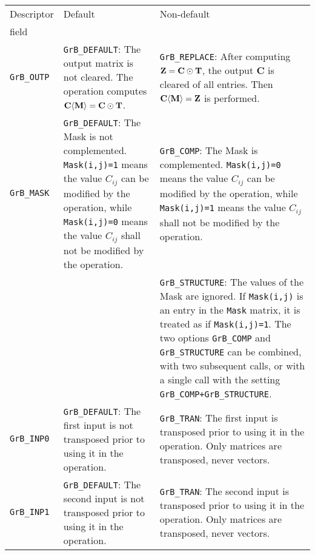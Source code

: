 \vspace{0.2in}
\noindent
{\footnotesize
\begin{tabular}{|l|p{2.4in}|p{2.2in}|}
\hline
Descriptor & Default   & Non-default \\
field      & &  \\
\hline

\verb'GrB_OUTP'
    & \verb'GrB_DEFAULT':
    The output matrix is not cleared.  The operation computes
    ${\bf C \langle M \rangle = C \odot T}$.
    & \verb'GrB_REPLACE':
    After computing ${\bf Z=C\odot T}$,
    the output {\bf C} is cleared of all entries.
    Then ${\bf C \langle M \rangle = Z}$ is performed. \\

\hline

\verb'GrB_MASK'
    & \verb'GrB_DEFAULT':
    The Mask is not complemented.  \verb'Mask(i,j)=1' means the value $C_{ij}$
    can be modified by the operation, while \verb'Mask(i,j)=0' means the value
    $C_{ij}$ shall not be modified by the operation.
    & \verb'GrB_COMP':
    The Mask is complemented.  \verb'Mask(i,j)=0' means the value $C_{ij}$
    can be modified by the operation, while \verb'Mask(i,j)=1' means the value
    $C_{ij}$ shall not be modified by the operation. \\
    &
    & \verb'GrB_STRUCTURE':
    The values of the Mask are ignored.  If \verb'Mask(i,j)' is an entry
    in the \verb'Mask' matrix, it is treated as if \verb'Mask(i,j)=1'.
    The two options \verb'GrB_COMP' and \verb'GrB_STRUCTURE' can be
    combined, with two subsequent calls, or with a single call with the setting
    \verb'GrB_COMP+GrB_STRUCTURE'.  \\

\hline

\verb'GrB_INP0'
    & \verb'GrB_DEFAULT':
    The first input is not transposed prior to using it in the operation.
    & \verb'GrB_TRAN':
    The first input is transposed prior to using it in the operation.  Only
    matrices are transposed, never vectors. \\

\hline

\verb'GrB_INP1'
    & \verb'GrB_DEFAULT':
    The second input is not transposed prior to using it in the operation.
    & \verb'GrB_TRAN':
    The second input is transposed prior to using it in the operation.  Only
    matrices are transposed, never vectors. \\

\hline


\end{tabular}}
